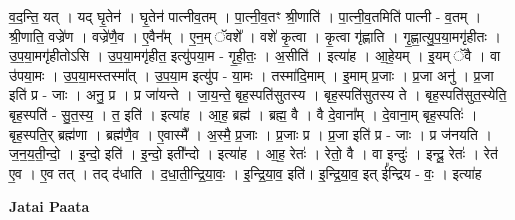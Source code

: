 \documentclass[17pt]{extarticle}
\begin{document}
व॒द॒न्ति॒ यत् । यद् घृ॒तेन॑ । घृ॒तेन॑ पात्नीव॒तम् । पा॒त्नी॒व॒तꣳ श्री॒णाति॑ । पा॒त्नी॒व॒तमिति॑ पात्नी - व॒तम् । श्री॒णाति॒ वज्रे॑ण । वज्रे॑णै॒व । ए॒वैन᳚म् । ए॒न॒म् ॅवशे᳚ । वशे॑ कृ॒त्वा । कृ॒त्वा गृ॑ह्णाति । गृ॒ह्णा॒त्यु॒प॒या॒मगृ॑हीतः । उ॒प॒या॒मगृ॑हीतोऽसि । उ॒प॒या॒मगृ॑हीत॒ इत्यु॑पया॒म - गृ॒ही॒तः॒ । अ॒सीति॑ । इत्या॑ह । आ॒हे॒यम् । इ॒यम् ॅवै । वा उ॑पया॒मः । उ॒प॒या॒मस्तस्मा᳚त् । उ॒प॒या॒म इत्यु॑प - या॒मः । तस्मा॑दि॒माम् । इ॒माम् प्र॒जाः । प्र॒जा अनु॑ । प्र॒जा इति॑ प्र - जाः । अनु॒ प्र । प्र जा॑यन्ते । जा॒य॒न्ते॒ बृह॒स्पति॑सुतस्य । बृह॒स्पति॑सुतस्य ते । बृह॒स्पति॑सुत॒स्येति॒ बृह॒स्पति॑ - सु॒त॒स्य॒ । त॒ इति॑ । इत्या॑ह । आ॒ह॒ ब्रह्म॑ । ब्रह्म॒ वै । वै दे॒वाना᳚म् । दे॒वाना॒म् बृह॒स्पतिः॑ । बृह॒स्पति॒र् ब्रह्म॑णा । ब्रह्म॑णै॒व । ए॒वास्मै᳚ । अ॒स्मै॒ प्र॒जाः । प्र॒जाः प्र । प्र॒जा इति॑ प्र - जाः । प्र ज॑नयति । ज॒न॒य॒ती॒न्दो॒ । इ॒न्दो॒ इति॑ । 
इ॒न्दो॒ इती᳚न्दो । इत्या॑ह । आ॒ह॒ रेतः॑ । रेतो॒ वै । वा इन्दुः॑ । इन्दू॒ रेतः॑ । रेत॑ ए॒व । ए॒व तत् । तद् द॑धाति । द॒धा॒ती॒न्द्रि॒या॒वः॒ । इ॒न्द्रि॒या॒व॒ इति॑। इ॒न्द्रि॒या॒व॒ इत् ई᳚न्द्रिय - वः॒ । इत्या॑ह \newline

\textbf{Jatai Paata} \newline
\end{document}
